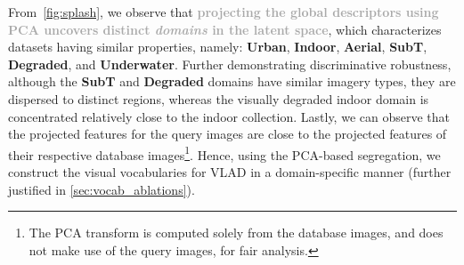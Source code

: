 \documentclass[letterpaper, 10 pt, conference]{ieeeconf}  \fi
\newcommand{\urban}[1]{\textbf{\textcolor{OutdoorDark}{Urban}}}
\newcommand{\indoor}[1]{\textbf{\textcolor{IndoorDark}{Indoor}}}
\newcommand{\aerial}[1]{\textbf{\textcolor{AerialDark}{Aerial}}}
\newcommand{\subt}[1]{\textbf{\textcolor{SubTDark}{SubT}}}
\newcommand{\degraded}[1]{\textbf{\textcolor{SubTDark}{Degraded}}}
\newcommand{\underwater}[1]{\textbf{\textcolor{UnderWaterDark}{Underwater}}}
\newcommand{\highlight}[1]{\textcolor{darkgray}{\textbf{#1}}}
\begin{document}
From~\cref{fig:splash}, we observe that \highlight{projecting the global descriptors using PCA uncovers distinct \emph{domains} in the latent space}, which characterizes datasets having similar properties, namely: \urban{}, \indoor{}, \aerial{}, \subt{}, \degraded{}, and \underwater{}.
Further demonstrating discriminative robustness, although the \subt{} and \degraded{} domains have similar imagery types, they are dispersed to distinct regions, whereas the visually degraded indoor domain is concentrated relatively close to the indoor collection.
Lastly, we can observe that the projected features for the query images are close to the projected features of their respective database images\footnote{The PCA transform is computed solely from the database images, and does not make use of the query images, for fair analysis.}.
Hence, using the PCA-based segregation, we construct the visual vocabularies for VLAD in a domain-specific manner (further justified in \cref{sec:vocab_ablations}). 
\end{document}
